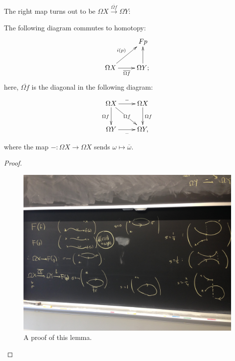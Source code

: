 The right map turns out to be $\Omega X\xrightarrow{\overline{\Omega f}}\Omega Y$:
\begin{lemma}
    The following diagram commutes to homotopy:
    \begin{equation*}
	\xymatrix{
	    & Fp\\
	    \Omega X\ar[r]_{\overline{\Omega f}}\ar[ur]^{i(p)} & \Omega Y;\ar[u]
	    }
    \end{equation*}
    here, $\overline{\Omega f}$ is the diagonal in the following diagram:
    \begin{equation*}
	\xymatrix{
	    \Omega X\ar[r]^{-}\ar[dr]|{\Omega f} \ar[d]_{\Omega f} & \Omega X\ar[d]^{\Omega f}\\
	    \Omega Y\ar[r]_{-} & \Omega Y,
	    }
    \end{equation*}
    where the map $-:\Omega X\to \Omega X$ sends $\omega\mapsto\overline{\omega}$.
\end{lemma}
\begin{proof}
\begin{figure}[H]
\centering
\includegraphics[width=\textwidth]{assets/barratt-puppe}
\caption{A proof of this lemma.}
\end{figure}
\end{proof}
